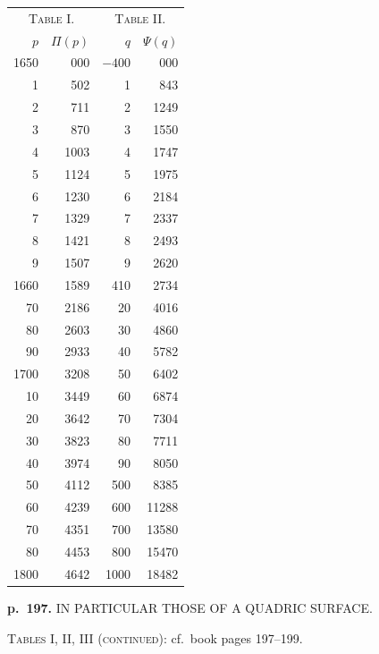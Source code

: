 \documentclass[11pt,a4paper]{article}
\begin{document}
\begin{center}
\begin{tabular}{rr@{\qquad\qquad}rr}
\multicolumn{2}{c}{\textsc{Table I.}} & \multicolumn{2}{c}{\textsc{Table II.}} \\
$p$ & $\Pi(p)$ & $q$ & $\Psi(q)$ \\
\hline
1650 & 000 & $-400$ & 000 \\
1 & 502 & 1 & 843 \\
2 & 711 & 2 & 1249 \\
3 & 870 & 3 & 1550 \\
4 & 1003 & 4 & 1747 \\
5 & 1124 & 5 & 1975 \\
6 & 1230 & 6 & 2184 \\
7 & 1329 & 7 & 2337 \\
8 & 1421 & 8 & 2493 \\
9 & 1507 & 9 & 2620 \\
1660 & 1589 & 410 & 2734 \\
70 & 2186 & 20 & 4016 \\
80 & 2603 & 30 & 4860 \\
90 & 2933 & 40 & 5782 \\
1700 & 3208 & 50 & 6402 \\
10 & 3449 & 60 & 6874 \\
20 & 3642 & 70 & 7304 \\
30 & 3823 & 80 & 7711 \\
40 & 3974 & 90 & 8050 \\
50 & 4112 & 500 & 8385 \\
60 & 4239 & 600 & 11288 \\
70 & 4351 & 700 & 13580 \\
80 & 4453 & 800 & 15470 \\
1800 & 4642 & 1000 & 18482 \\
\end{tabular}
\end{center}

\clearpage

\noindent
\textbf{p.~197.}  IN PARTICULAR THOSE OF A QUADRIC SURFACE.

\begin{center}
\textsc{Tables I, II, III (continued)}: cf.\ book pages 197--199.
\end{center}

\end{document}
